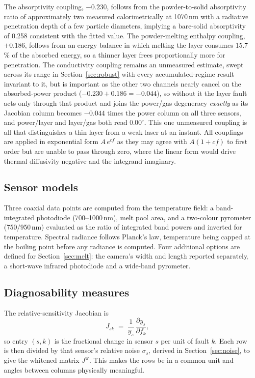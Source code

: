 \documentclass[final,5p,times,twocolumn]{elsarticle}
\begin{document}
The absorptivity
coupling, $-0.230$, follows from the powder-to-solid absorptivity ratio of
approximately two measured calorimetrically at 1070\,nm \cite{Trapp2017} with a
radiative penetration depth of a few particle diameters, implying a bare-solid
absorptivity of 0.258 consistent with the fitted value. The powder-melting
enthalpy coupling, $+0.186$, follows from an energy balance in which melting the
layer consumes 15.7\,\% of the absorbed energy, so a thinner layer frees
proportionally more for penetration. The conductivity coupling remains an unmeasured estimate, swept across its range
in Section~\ref{sec:robust} with every accumulated-regime result invariant to it,
but is important as the other two channels nearly cancel on
the absorbed-power product ($-0.230+0.186=-0.044$), so without it the layer fault
acts only through that product and joins the power/gas degeneracy
\emph{exactly} as its Jacobian column becomes $-0.044$ times the power column on
all three sensors, and power/layer and layer/gas both read $0.00^\circ$. This one
unmeasured coupling is all that distinguishes a thin layer from a weak laser at
an instant. All couplings are applied in exponential form $A\,e^{cf}$ as they may agree with
$A(1+cf)$ to first order but are unable to pass through zero, where the linear form
would drive thermal diffusivity negative and the integrand imaginary.

\subsection{Sensor models}

Three coaxial data points are computed from the temperature field: a
band-integrated photodiode (700--1000\,nm), melt pool area, and a two-colour
pyrometer (750/950\,nm) evaluated as the ratio of integrated band powers and
inverted for temperature. Spectral radiance follows Planck's law, temperature
being capped at the boiling point before any radiance is computed. Four
additional options are defined for Section~\ref{sec:melt}: the camera's width and length
reported separately, a short-wave infrared photodiode and a wide-band
pyrometer.

\subsection{Diagnosability measures}
\label{sec:measures}

The relative-sensitivity Jacobian is
%
\begin{equation}
J_{sk} \;=\; \frac{1}{y_s}\,\frac{\partial y_s}{\partial f_k},
\label{eq:jac}
\end{equation}
%
so entry $(s,k)$ is the fractional change in sensor $s$ per unit of fault $k$.
Each row is then
divided by that sensor's relative noise $\sigma_s$, derived in
Section~\ref{sec:noise}, to give the whitened matrix $J^{\mathrm{w}}$. This makes the rows be in a common unit and angles between columns physically meaningful.
\end{document}
